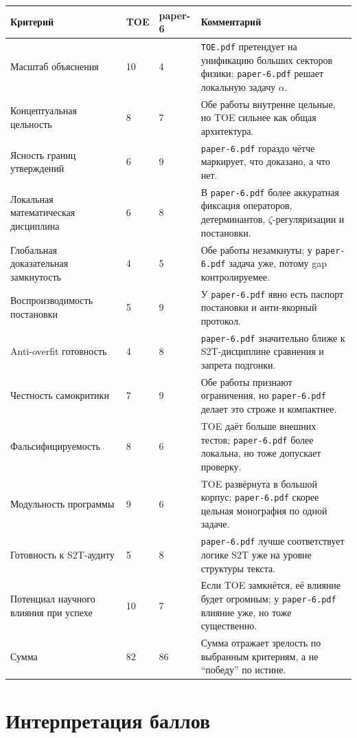 \documentclass[12pt,a4paper]{article}
\begin{document}
\begin{longtable}{p{5.3cm}p{2cm}p{2cm}p{5.6cm}}
\toprule
Критерий & TOE & paper-6 & Комментарий \\
\midrule
\endhead
Масштаб объяснения & 10 & 4 & \texttt{TOE.pdf} претендует на унификацию больших секторов физики; \texttt{paper-6.pdf} решает локальную задачу \(\alpha\). \\
Концептуальная цельность & 8 & 7 & Обе работы внутренне цельные, но TOE сильнее как общая архитектура. \\
Ясность границ утверждений & 6 & 9 & \texttt{paper-6.pdf} гораздо чётче маркирует, что доказано, а что нет. \\
Локальная математическая дисциплина & 6 & 8 & В \texttt{paper-6.pdf} более аккуратная фиксация операторов, детерминантов, \(\zeta\)-регуляризации и постановки. \\
Глобальная доказательная замкнутость & 4 & 5 & Обе работы незамкнуты; у \texttt{paper-6.pdf} задача уже, потому gap контролируемее. \\
Воспроизводимость постановки & 5 & 9 & У \texttt{paper-6.pdf} явно есть паспорт постановки и анти-якорный протокол. \\
Anti-overfit готовность & 4 & 8 & \texttt{paper-6.pdf} значительно ближе к S2T-дисциплине сравнения и запрета подгонки. \\
Честность самокритики & 7 & 9 & Обе работы признают ограничения, но \texttt{paper-6.pdf} делает это строже и компактнее. \\
Фальсифицируемость & 8 & 6 & TOE даёт больше внешних тестов; \texttt{paper-6.pdf} более локальна, но тоже допускает проверку. \\
Модульность программы & 9 & 6 & TOE развёрнута в большой корпус; \texttt{paper-6.pdf} скорее цельная монография по одной задаче. \\
Готовность к S2T-аудиту & 5 & 8 & \texttt{paper-6.pdf} лучше соответствует логике S2T уже на уровне структуры текста. \\
Потенциал научного влияния при успехе & 10 & 7 & Если TOE замкнётся, её влияние будет огромным; у \texttt{paper-6.pdf} влияние уже, но тоже существенно. \\
\midrule
Сумма & 82 & 86 & Сумма отражает зрелость по выбранным критериям, а не ``победу'' по истине. \\
\bottomrule
\end{longtable}

\section{Интерпретация баллов}
\end{document}
